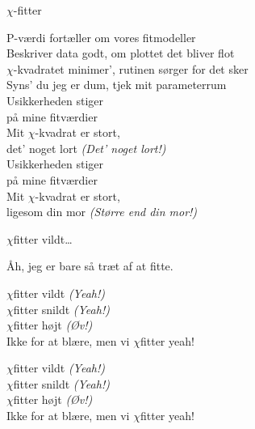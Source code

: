 \begin{song}{$\chi$-fitter}
  \begin{SBVerse}
    P-værdi fortæller om vores fitmodeller\\
    Beskriver data godt, om plottet det bliver flot\\
    $\chi$-kvadratet minimer', rutinen sørger for det sker\\
    Syns' du jeg er dum, tjek mit parameterrum\\\medskip
    Usikkerheden stiger\\
    på mine fitværdier\\
    Mit $\chi$-kvadrat er stort,\\
    det' noget lort \emph{(Det' noget lort!)}\\\medskip
    Usikkerheden stiger\\
    på mine fitværdier\\
    Mit $\chi$-kvadrat er stort,\\
    ligesom din mor \emph{(Større end din mor!)}
  \end{SBVerse}

  \begin{SBChorus}
    $\chi$fitter vildt\ldots
  \end{SBChorus}

  \begin{SBSection*}
    Åh, jeg er bare så træt af at fitte.
  \end{SBSection*}

  \begin{SBChorus}
    $\chi$fitter vildt \emph{(Yeah!)}\\
    $\chi$fitter snildt \emph{(Yeah!)}\\
    $\chi$fitter højt \emph{(Øv!)}\\
    Ikke for at blære, men vi $\chi$fitter yeah!
  \end{SBChorus}

  \begin{SBChorus}
    $\chi$fitter vildt \emph{(Yeah!)}\\
    $\chi$fitter snildt \emph{(Yeah!)}\\
    $\chi$fitter højt \emph{(Øv!)}\\
    Ikke for at blære, men vi $\chi$fitter yeah!
  \end{SBChorus}


\end{song}